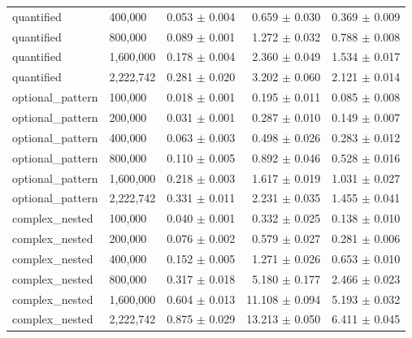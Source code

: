 {\begin{longtable}{>{\ttfamily}llrrr}
quantified & 400{,}000 & 0.053 $\pm$ 0.004 & 0.659 $\pm$ 0.030 & 0.369 $\pm$ 0.009 \\
quantified & 800{,}000 & 0.089 $\pm$ 0.001 & 1.272 $\pm$ 0.032 & 0.788 $\pm$ 0.008 \\
quantified & 1{,}600{,}000 & 0.178 $\pm$ 0.004 & 2.360 $\pm$ 0.049 & 1.534 $\pm$ 0.017 \\
quantified & 2{,}222{,}742 & 0.281 $\pm$ 0.020 & 3.202 $\pm$ 0.060 & 2.121 $\pm$ 0.014 \\
\midrule
optional\_pattern & 100{,}000 & 0.018 $\pm$ 0.001 & 0.195 $\pm$ 0.011 & 0.085 $\pm$ 0.008 \\
optional\_pattern & 200{,}000 & 0.031 $\pm$ 0.001 & 0.287 $\pm$ 0.010 & 0.149 $\pm$ 0.007 \\
optional\_pattern & 400{,}000 & 0.063 $\pm$ 0.003 & 0.498 $\pm$ 0.026 & 0.283 $\pm$ 0.012 \\
optional\_pattern & 800{,}000 & 0.110 $\pm$ 0.005 & 0.892 $\pm$ 0.046 & 0.528 $\pm$ 0.016 \\
optional\_pattern & 1{,}600{,}000 & 0.218 $\pm$ 0.003 & 1.617 $\pm$ 0.019 & 1.031 $\pm$ 0.027 \\
optional\_pattern & 2{,}222{,}742 & 0.331 $\pm$ 0.011 & 2.231 $\pm$ 0.035 & 1.455 $\pm$ 0.041 \\
\midrule
complex\_nested & 100{,}000 & 0.040 $\pm$ 0.001 & 0.332 $\pm$ 0.025 & 0.138 $\pm$ 0.010 \\
complex\_nested & 200{,}000 & 0.076 $\pm$ 0.002 & 0.579 $\pm$ 0.027 & 0.281 $\pm$ 0.006 \\
complex\_nested & 400{,}000 & 0.152 $\pm$ 0.005 & 1.271 $\pm$ 0.026 & 0.653 $\pm$ 0.010 \\
complex\_nested & 800{,}000 & 0.317 $\pm$ 0.018 & 5.180 $\pm$ 0.177 & 2.466 $\pm$ 0.023 \\
complex\_nested & 1{,}600{,}000 & 0.604 $\pm$ 0.013 & 11.108 $\pm$ 0.094 & 5.193 $\pm$ 0.032 \\
complex\_nested & 2{,}222{,}742 & 0.875 $\pm$ 0.029 & 13.213 $\pm$ 0.050 & 6.411 $\pm$ 0.045 \\
\end{longtable}
}

